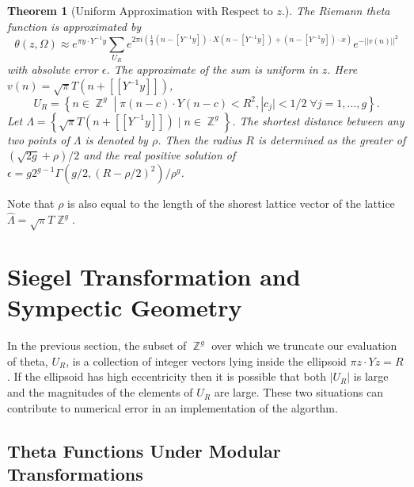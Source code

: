\documentclass[12]{article}
\newtheorem{theorem}{Theorem}
\DeclareMathOperator{\ZZ}{\mathbb{Z}}
\begin{document}
\begin{theorem}[Uniform Approximation with Respect to $z$.]
The Riemann theta function is approximated by
\begin{equation} \label{eqn: uniform}
  \theta(z,\Omega)
  \approx
  e^{\pi y \cdot Y^{-1} y}
  \sum_{U_R} e^{2 \pi i \left( \tfrac{1}{2} \left( n - [Y^{-1}y] \right)
    \cdot X \left( n - [Y^{-1}y] \right) +
    \left( n - [Y^{-1}y] \right) \cdot x \right)}
    e^{- ||v(n)||^2}
\end{equation}
with absolute error $\epsilon$. The approximate of the sum is uniform in $z$.
Here $v(n) = \sqrt{\pi} T \left( n + [[Y^{-1}y]] \right)$,
\begin{equation} \label{eqn: uniform points}
  U_R = \left\{ n \in \ZZ^g \; | \; \pi (n-c) \cdot Y (n-c) < R^2,
                |c_j| < 1/2 \; \forall j = 1,\ldots,g \right\}.
\end{equation}
Let $\Lambda = \left\{ \sqrt{\pi}T \left( n + [[Y^{-1}y]] \right) \; | \; n \in
\ZZ^g \right\}$. The shortest distance between any two points of $\Lambda$ is
denoted by $\rho$. Then the radius $R$ is determined as the greater of
$(\sqrt{2g} + \rho)/2$ and the real positive solution of $\epsilon =
g2^{g-1}\Gamma(g/2,(R-\rho/2)^2)/\rho^g$.
\end{theorem}


Note that $\rho$ is also equal to the length of the shorest lattice vector of
the lattice $\hat{\Lambda} = \sqrt{\pi}T\ZZ^g$.


\section{Siegel Transformation and Sympectic Geometry}\label{sec:siegel}



In the previous section, the subset of $\ZZ^g$ over which we truncate our
evaluation of theta, $U_R$, is a collection of integer vectors lying inside the
ellipsoid $\pi z \cdot Yz = R$. If the ellipsoid has high eccentricity then it
is possible that both $|U_R|$ is large and the magnitudes of the elements of
$U_R$ are large. These two situations can contribute to numerical error in an
implementation of the algorthm.




\subsection{Theta Functions Under Modular Transformations}
\end{document}
